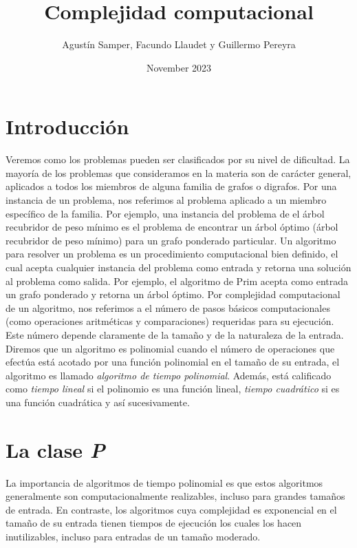 \documentclass{article}
\title{Complejidad computacional}
\author{Agustín Samper, Facundo Llaudet y Guillermo Pereyra}
\date{November 2023}
\begin{document}
\maketitle
\section*{Introducción}
Veremos como los problemas pueden ser clasificados por su nivel de dificultad. \newline
\indent La mayoría de los problemas que consideramos en la materia son de 
carácter general, aplicados a todos los miembros de alguna familia de
grafos o digrafos. Por una instancia de un problema, nos referimos al
problema aplicado a un miembro específico de la familia. Por ejemplo,
una instancia del problema de el árbol recubridor de peso mínimo es el
problema de encontrar un árbol óptimo (árbol recubridor de peso mínimo)
para un grafo ponderado particular. \newline
\indent Un algoritmo para resolver un problema es un procedimiento
computacional bien definido, el cual acepta cualquier instancia del problema
como entrada y retorna una solución al problema como salida. Por ejemplo,
el algoritmo de Prim acepta como entrada un grafo ponderado y retorna un
árbol óptimo. \newline
\indent Por complejidad computacional de un algoritmo, nos referimos a el
número de pasos básicos computacionales (como operaciones aritméticas y
comparaciones) requeridas para su ejecución. Este número depende claramente
de la tamaño y de la naturaleza de la entrada. \newline
\indent Diremos que un algoritmo es polinomial cuando el número de
operaciones que efectúa está acotado por una función polinomial en
el tamaño de su entrada, el algoritmo es llamado \textit{algoritmo
de tiempo polinomial}. Además, está calificado como \textit{tiempo lineal}
si el polinomio es una función lineal, \textit{tiempo cuadrático} si 
es una función cuadrática y así sucesivamente.

\section*{La clase \textit{P}}
La importancia de algoritmos de tiempo polinomial es que estos algoritmos
generalmente son computacionalmente realizables, incluso para grandes
tamaños de entrada. En contraste, los algoritmos cuya complejidad es
exponencial en el tamaño de su entrada tienen tiempos de ejecución los
cuales los hacen inutilizables, incluso para entradas de un tamaño
moderado.
\end{document}
